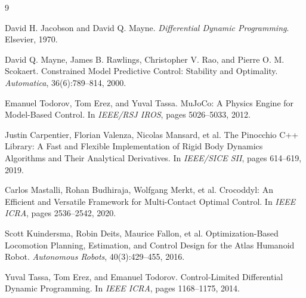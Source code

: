 \documentclass[UTF8,11pt,a4paper]{ctexart}
\begin{document}
\begin{thebibliography}{9}

David H. Jacobson and David Q. Mayne.
\newblock \emph{Differential Dynamic Programming}.
\newblock Elsevier, 1970.

David Q. Mayne, James B. Rawlings, Christopher V. Rao, and Pierre O. M. Scokaert.
\newblock Constrained Model Predictive Control: Stability and Optimality.
\newblock \emph{Automatica}, 36(6):789--814, 2000.

Emanuel Todorov, Tom Erez, and Yuval Tassa.
\newblock MuJoCo: A Physics Engine for Model-Based Control.
\newblock In \emph{IEEE/RSJ IROS}, pages 5026--5033, 2012.

Justin Carpentier, Florian Valenza, Nicolas Mansard, et al.
\newblock The Pinocchio C++ Library: A Fast and Flexible Implementation of Rigid Body Dynamics Algorithms and Their Analytical Derivatives.
\newblock In \emph{IEEE/SICE SII}, pages 614--619, 2019.

Carlos Mastalli, Rohan Budhiraja, Wolfgang Merkt, et al.
\newblock Crocoddyl: An Efficient and Versatile Framework for Multi-Contact Optimal Control.
\newblock In \emph{IEEE ICRA}, pages 2536--2542, 2020.

Scott Kuindersma, Robin Deits, Maurice Fallon, et al.
\newblock Optimization-Based Locomotion Planning, Estimation, and Control Design for the Atlas Humanoid Robot.
\newblock \emph{Autonomous Robots}, 40(3):429--455, 2016.

Yuval Tassa, Tom Erez, and Emanuel Todorov.
\newblock Control-Limited Differential Dynamic Programming.
\newblock In \emph{IEEE ICRA}, pages 1168--1175, 2014.

\end{thebibliography}
\end{document}
